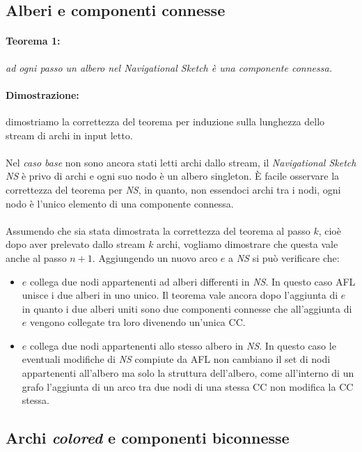 \documentclass[a4paper,11pt]{report}
\begin{document}
\subsection{Alberi e componenti connesse}\label{Alberi e componenti connesse}
\paragraph{Teorema 1:}\emph{ad ogni passo un albero nel Navigational Sketch è una componente connessa.}
\paragraph{Dimostrazione:} dimostriamo la correttezza del teorema per induzione sulla lunghezza dello stream di archi in input letto.
\paragraph{}
Nel \emph{caso base} non sono ancora stati letti archi dallo stream, il \emph{Navigational Sketch NS} è privo di archi e ogni suo nodo è un
albero singleton.
È facile osservare la correttezza del teorema per \emph{NS}, in quanto, non essendoci archi tra i nodi, ogni nodo è l'unico elemento di una
componente connessa.
\paragraph{}
Assumendo che sia stata dimostrata la correttezza del teorema al passo $k$, cioè dopo aver prelevato dallo stream $k$ archi, vogliamo
dimostrare che questa vale anche al passo $n+1$. 
Aggiungendo un nuovo arco $e$ a \emph{NS} si può verificare che:
\begin{itemize}
 \item $e$ collega due nodi appartenenti ad alberi differenti in \emph{NS}. In questo caso AFL unisce i due alberi in uno unico. Il teorema
vale ancora dopo l'aggiunta di $e$
in quanto i due alberi uniti sono due componenti connesse che all'aggiunta di $e$ vengono collegate tra loro divenendo un'unica CC.
 \item $e$ collega due nodi appartenenti allo stesso albero in \emph{NS}. In questo caso le eventuali modifiche di \emph{NS} compiute da AFL
non cambiano il set di nodi appartenenti
all'albero ma solo la struttura dell'albero, come all'interno di un grafo l'aggiunta di un arco tra due nodi di una stessa CC non modifica
la CC stessa.
\end{itemize}

\subsection{Archi \emph{colored} e componenti biconnesse}\label{Archi colored e componenti biconnesse}
\end{document}

